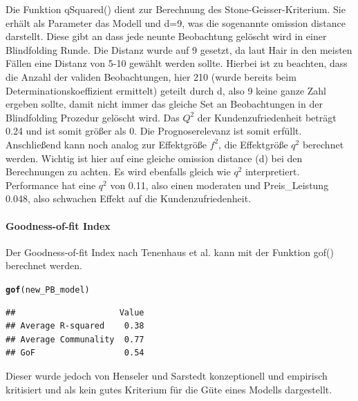 \documentclass{article}\usepackage[]{graphicx}\usepackage[]{color}
\makeatletter
\newcommand{\hlstd}[1]{\textcolor[rgb]{0.345,0.345,0.345}{#1}}%
\newcommand{\hlkwd}[1]{\textcolor[rgb]{0.737,0.353,0.396}{\textbf{#1}}}%
\newenvironment{kframe}{%
 \def\at@end@of@kframe{}%
 \ifinner\ifhmode%
  \def\at@end@of@kframe{\end{minipage}}%
  \begin{minipage}{\columnwidth}%
 \fi\fi%
 \def\FrameCommand##1{\hskip\@totalleftmargin \hskip-\fboxsep
 \colorbox{shadecolor}{##1}\hskip-\fboxsep
     \hskip-\linewidth \hskip-\@totalleftmargin \hskip\columnwidth}%
 \MakeFramed {\advance\hsize-\width
   \@totalleftmargin\z@ \linewidth\hsize
   \@setminipage}}%
 {\par\unskip\endMakeFramed%
 \at@end@of@kframe}
\newenvironment{knitrout}{}{} %
\makeatother
\begin{document}
Die Funktion qSquared() dient zur Berechnung des Stone-Geisser-Kriterium. Sie erhält als Parameter das Modell und d=9, was die sogenannte omission distance darstellt. Diese gibt an dass jede neunte Beobachtung gelöscht wird in einer Blindfolding Runde. Die Distanz wurde auf 9 gesetzt, da laut Hair\cite{hair2012assessment} in den meisten Fällen eine Distanz von 5-10 gewählt werden sollte. Hierbei ist zu beachten, dass die Anzahl der validen Beobachtungen, hier 210 (wurde bereits beim Determinationskoeffizient ermittelt) geteilt durch d, also 9 keine ganze Zahl ergeben sollte, damit nicht immer das gleiche Set an Beobachtungen in der Blindfolding Prozedur gelöscht wird. Das $Q^{2}$ der Kundenzufriedenheit beträgt 0.24 und ist somit größer als 0. Die Prognoserelevanz ist somit erfüllt. Anschließend kann noch analog zur Effektgröße $f^{2}$, die Effektgröße $q^{2}$ berechnet werden. Wichtig ist hier auf eine gleiche omission distance (d) bei den Berechnungen zu achten. Es wird ebenfalls gleich wie $q^{2}$ interpretiert. Performance hat eine $q^{2}$ von 0.11, also einen moderaten und Preis\_Leistung 0.048, also schwachen Effekt auf die Kundenzufriedenheit.

\paragraph{Goodness-of-fit Index}
Der Goodness-of-fit Index nach Tenenhaus et al.\cite{tenenhaus2004global} kann mit der Funktion gof() berechnet werden.
\begin{knitrout}
\color{fgcolor}\begin{kframe}
\begin{alltt}
\hlkwd{gof}\hlstd{(new_PB_model)}
\end{alltt}
\begin{verbatim}
##                     Value
## Average R-squared    0.38
## Average Communality  0.77
## GoF                  0.54
\end{verbatim}
\end{kframe}
\end{knitrout}
Dieser wurde jedoch von Henseler und Sarstedt konzeptionell und empirisch kritisiert und als kein gutes Kriterium für die Güte eines Modells dargestellt.\cite{henseler2013goodness} 
\end{document}
